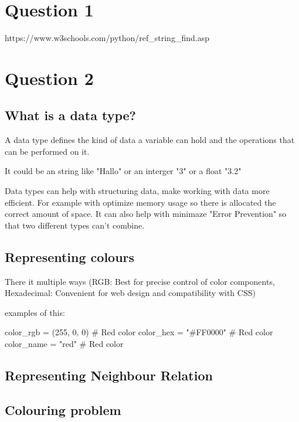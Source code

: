 \documentclass{article}
\begin{document}
\section{Question 1}



https://www.w3schools.com/python/ref_string_find.asp




\section{Question 2}


\subsection{What is a data type?}

A data type defines the kind of data a variable can hold and the operations that can be performed on it. 

It could be an string like "Hallo" or an interger "3" or a float "3.2" 

Data types can help with structuring data, make working with data more efficient. For example with optimize memory usage so there is allocated the correct amount of space. It can also help with minimaze "Error Prevention" so that two different types can't combine.



\subsection{Representing colours}

There it multiple ways (RGB: Best for precise control of color components, Hexadecimal: Convenient for web design and compatibility with CSS) 


examples of this:

color_rgb = (255, 0, 0)  # Red color
color_hex = "#FF0000"  # Red color
color_name = "red"  # Red color


\subsection{Representing Neighbour Relation}




\subsection{Colouring problem}
\end{document}
